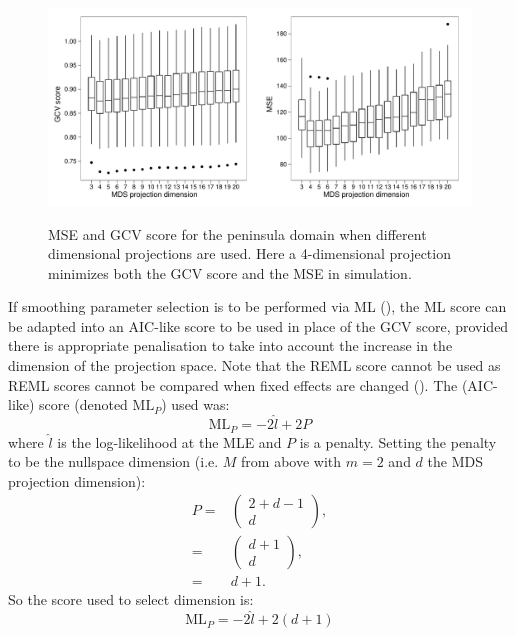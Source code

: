 \begin{figure}
\centering
\includegraphics[width=6in]{mds/figs/wt2-gcv-projdim-boxplot.pdf} \\
\caption{MSE and GCV score for the peninsula domain when different dimensional projections are used. Here a 4-dimensional projection minimizes both the GCV score and the MSE in simulation.}
\label{wt2-gcv-projdim-boxplot}
\end{figure}

If smoothing parameter selection is to be performed via ML (), the ML score can be adapted into an AIC-like score to be used in place of the GCV score, provided there is appropriate penalisation to take into account the increase in the dimension of the projection space. Note that the REML score cannot be used as REML scores cannot be compared when fixed effects are changed (\cite{remlpaper}). The (AIC-like) score (denoted $\text{ML}_P$) used was:
\begin{equation*}
\text{ML}_P = -2 \hat{l} + 2P
\end{equation*}
where $\hat{l}$ is the log-likelihood at the MLE and $P$ is a penalty. Setting the penalty to be the nullspace dimension (i.e. $M$ from above with $m=2$ and $d$ the MDS projection dimension):
\begin{align*}
P =& \begin{pmatrix} 2+d-1 \\ d  \end{pmatrix},\\
=& \begin{pmatrix} d+1 \\ d  \end{pmatrix},\\
=& d+1.
\end{align*}
So the score used to select dimension is:
\begin{equation*}
\text{ML}_P = -2 \hat{l} + 2(d+1)
\end{equation*}

